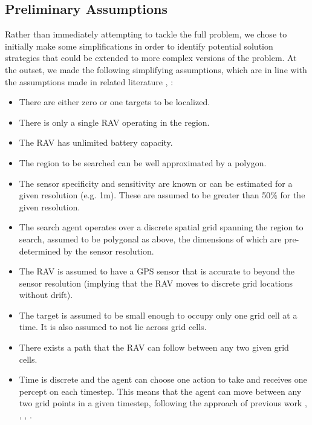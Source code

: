 \subsection{Preliminary Assumptions}\label{subsec:initalAssumptions}

Rather than immediately attempting to tackle the full problem, we chose to initially make some simplifications in order to identify potential solution strategies that could be extended to more complex versions of the problem. At the outset, we made the following simplifying assumptions, which are in line with the assumptions made in related literature \cite{Chung2007ASearch}, \cite{Chung2008Multi-agentFramework}:
\begin{itemize}
    \item There are either zero or one targets to be localized.
    \item There is only a single RAV operating in the region.
    \item The RAV has unlimited battery capacity.
    \item The region to be searched can be well approximated by a polygon.
    \item The sensor specificity and sensitivity are known or can be estimated for a given resolution (e.g. 1m). These are assumed to be greater than 50\% for the given resolution.
    \item The search agent operates over a discrete spatial grid spanning the region to search, assumed to be polygonal as above, the dimensions of which are pre-determined by the sensor resolution.
    \item The RAV is assumed to have a GPS sensor that is accurate to beyond the sensor resolution (implying that the RAV moves to discrete grid locations without drift).
    \item The target is assumed to be small enough to occupy only one grid cell at a time. It is also assumed to not lie across grid cells.
    \item There exists a path that the RAV can follow between any two given grid cells.
    \item Time is discrete and the agent can choose one action to take and receives one percept on each timestep. This means that the agent can move between any two grid points in a given timestep, following the approach of previous work \cite{Chung2007ASearch}, \cite{Chung2008Multi-agentFramework}, \cite{Kriheli2016OptimalInspections}, \cite{Waharte2009CoordinatedUAVs}.
\end{itemize}

